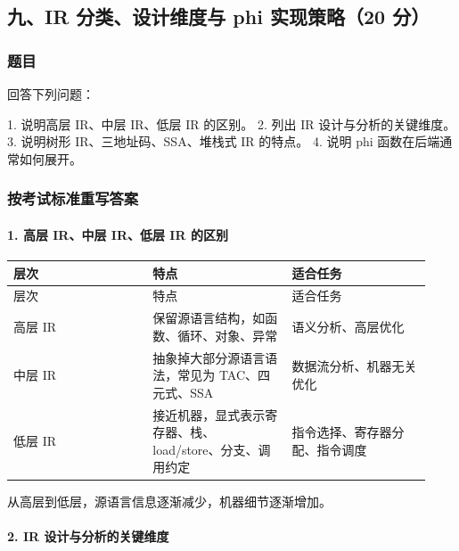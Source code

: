 \documentclass[UTF8]{ctexart}
\begin{document}
\subsection*{九、IR 分类、设计维度与 phi 实现策略（20 分）}

\subsubsection*{题目}

回答下列问题：

1. 说明高层 IR、中层 IR、低层 IR 的区别。 2. 列出 IR 设计与分析的关键维度。 3. 说明树形 IR、三地址码、SSA、堆栈式 IR 的特点。 4. 说明 phi 函数在后端通常如何展开。

\subsubsection*{按考试标准重写答案}

\paragraph*{1. 高层 IR、中层 IR、低层 IR 的区别}

\begin{longtable}{|p{0.31\linewidth}|p{0.31\linewidth}|p{0.31\linewidth}|}
\hline
层次 & 特点 & 适合任务 \\
\hline
\endfirsthead
层次 & 特点 & 适合任务 \\
\hline
\endhead
高层 IR & 保留源语言结构，如函数、循环、对象、异常 & 语义分析、高层优化 \\
\hline
中层 IR & 抽象掉大部分源语言语法，常见为 TAC、四元式、SSA & 数据流分析、机器无关优化 \\
\hline
低层 IR & 接近机器，显式表示寄存器、栈、load/store、分支、调用约定 & 指令选择、寄存器分配、指令调度 \\
\hline
\end{longtable}

从高层到低层，源语言信息逐渐减少，机器细节逐渐增加。

\paragraph*{2. IR 设计与分析的关键维度}
\end{document}
